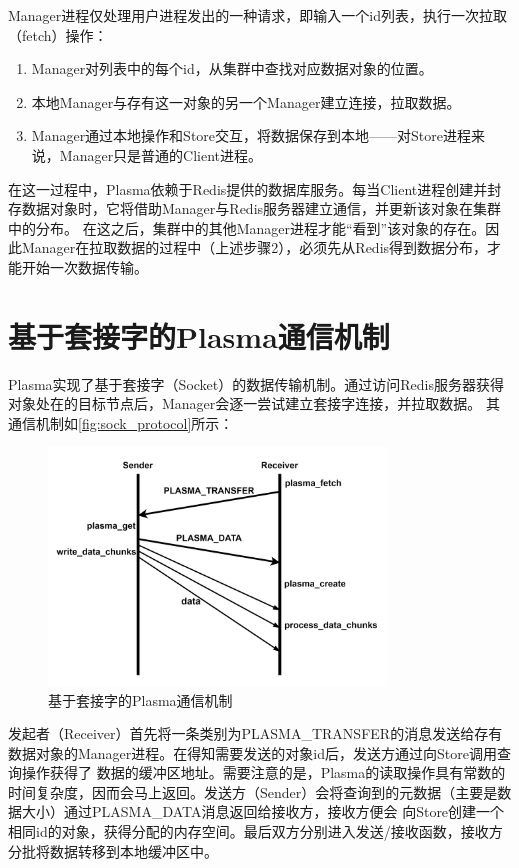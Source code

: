 Manager进程仅处理用户进程发出的一种请求，即输入一个id列表，执行一次拉取（fetch）操作：

\begin{enumerate}
    \item Manager对列表中的每个id，从集群中查找对应数据对象的位置。 
    \item 本地Manager与存有这一对象的另一个Manager建立连接，拉取数据。
    \item Manager通过本地操作和Store交互，将数据保存到本地——对Store进程来说，Manager只是普通的Client进程。
\end{enumerate}

在这一过程中，Plasma依赖于Redis提供的数据库服务。每当Client进程创建并封存数据对象时，它将借助Manager与Redis服务器建立通信，并更新该对象在集群中的分布。
在这之后，集群中的其他Manager进程才能“看到”该对象的存在。因此Manager在拉取数据的过程中（上述步骤2），必须先从Redis得到数据分布，才能开始一次数据传输。

\section{基于套接字的Plasma通信机制}

Plasma实现了基于套接字（Socket）的数据传输机制。通过访问Redis服务器获得对象处在的目标节点后，Manager会逐一尝试建立套接字连接，并拉取数据。
其通信机制如\autoref{fig:sock_protocol}所示：

\begin{figure}[h] 
    \centering
    \includegraphics[width=0.8\textwidth]{image/chap02/sock_protocol.png}
    \caption{基于套接字的Plasma通信机制}
    \label{fig:sock_protocol}
\end{figure}

发起者（Receiver）首先将一条类别为PLASMA\_TRANSFER的消息发送给存有数据对象的Manager进程。在得知需要发送的对象id后，发送方通过向Store调用查询操作获得了
数据的缓冲区地址。需要注意的是，Plasma的读取操作具有常数的时间复杂度，因而会马上返回。发送方（Sender）会将查询到的元数据（主要是数据大小）通过PLASMA\_DATA消息返回给接收方，接收方便会
向Store创建一个相同id的对象，获得分配的内存空间。最后双方分别进入发送/接收函数，接收方分批将数据转移到本地缓冲区中。


